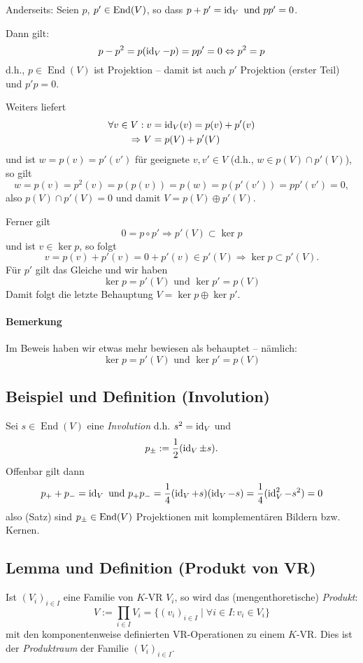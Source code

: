 	Anderseits: Seien $p$, $p'\in \operatorname{End}(V)$, so dass $p+p' = \operatorname{id}_V \text{ und } pp' = 0$.
		
	Dann gilt:
		\[p-p^2 = p(\operatorname{id}_V-p) = pp' = 0 \Leftrightarrow p^2=p\]
	d.h., $p\in\operatorname{End}(V)$ ist Projektion -- damit ist auch $p'$ Projektion (erster Teil) und $p' p = 0 $.
	
	Weiters liefert
        \begin{align*}
		\forall v\in V: v&=\operatorname{id}_V(v) = p(v) + p'(v)\\
		\Rightarrow V &= p(V)+p'(V)
        \end{align*}
	und ist $w = p(v)= p'(v')$ für geeignete $v,v'\in V$ (d.h., $w \in p(V)\cap p'(V)$), so gilt
		\[ w = p(v) = p^2(v) = p(p(v)) = p(w) = p(p'(v')) = pp'(v') = 0, \]
	also $p(V)\cap p'(V) = {0}$ und damit $V = p(V)\oplus p'(V)$. 
	
	Ferner gilt
		\[0 = p \circ p' \Rightarrow p'(V)\subset \ker p\]
	und ist $v\in \ker p$, so folgt
		\[v = p(v) + p'(v) = 0 + p'(v)\in p'(V) \Rightarrow \ker p \subset p'(V).\]
	Für $p'$ gilt das Gleiche und wir haben 
	\[\ker p = p'(V) \text{ und } \ker p' = p(V)\]
	Damit folgt die letzte Behauptung $V = \ker p \oplus\ker p'$.
	
\paragraph{Bemerkung}
	Im Beweis haben wir etwas mehr bewiesen als behauptet -- nämlich:
		\[ \ker p = p'(V)\text{ und }\ker p' = p(V) \]
		
\subsection{Beispiel und Definition (Involution)}	
	\begin{Definition}[Definition]
		Sei $s\in \operatorname{End}(V)$ eine \emph{Involution} d.h. $s^2 = \operatorname{id}_V$  und 
		\[ p_\pm := \frac{1}{2}(\operatorname{id}_V\pm s). \]
	Offenbar gilt dann
		\[ p_{+} + p_{-} = \operatorname{id}_V \text{ und } p_+ p_{-} = \frac{1}{4}(\operatorname{id}_V +s)(\operatorname{id}_V -s) =  \frac{1}{4}(\operatorname{id}_V^2-s^2)=0 \]
	also (Satz) sind $p_\pm\in\operatorname{End}(V)$ Projektionen mit komplementären Bildern bzw. Kernen.
	\end{Definition}
		
\subsection{Lemma und Definition (Produkt von VR)}
	\begin{Definition}
		Ist $(V_i)_{i\in I}$ eine Familie von $ K $-VR $V_i$, so wird das (mengenthoretische) \emph{Produkt}:
		\[V:= \prod_{i\in I}V_i=\{(v_i)_{i\in I}\mid\forall i\in I:v_i\in V_i\}\]
	mit den komponentenweise definierten VR-Operationen zu einem $ K $-VR. Dies ist der \emph{Produktraum} der Familie	$(V_i)_{i\in I}$.
	\end{Definition}
		
